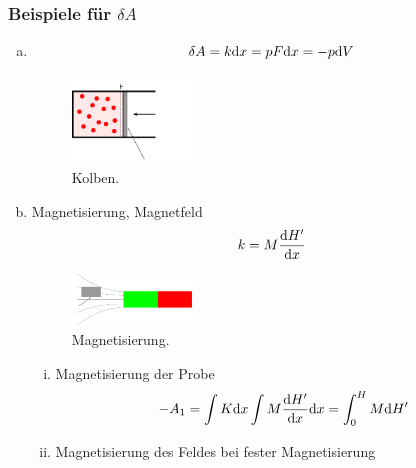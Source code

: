 \subsubsection{Beispiele für $\delta A$}
\begin{enumerate}[a)]
    \item
    \begin{equation}
        \delta A = k \mathrm{d} x = p F \mathrm{d} x = - p \mathrm{d} V
    \end{equation}
    \begin{figure}[H]
        \begin{center}
            \includegraphics[width=0.3\textwidth]{../img/exampleDApiston.pdf}
            \caption{Kolben.}  %
            \label{img:exampleDApiston}
        \end{center}
    \end{figure}
    \item Magnetisierung, Magnetfeld
    \begin{equation}
        k = M \frac{\mathrm{d} H'}{\mathrm{d} x}
    \end{equation}
    \begin{figure}[H]
        \begin{center}
            \includegraphics[width=0.3\textwidth]{../img/exampleDAmagnetism.pdf}
            \caption{Magnetisierung.}  %
            \label{img:exampleDAmagnetism}
        \end{center}
    \end{figure}
    \begin{enumerate}[i)]
        \item Magnetisierung der Probe
        \begin{equation}
            -A_1 = \int K \mathrm{d} x \int M \frac{\mathrm{d} H'}{\mathrm{d} x} \mathrm{d} x = \int_{0}^{H} M \mathrm{d} H'
        \end{equation}
        \item Magnetisierung des Feldes bei fester Magnetisierung
        \begin{equation}

\end{equation}
\end{enumerate}
\end{enumerate}
